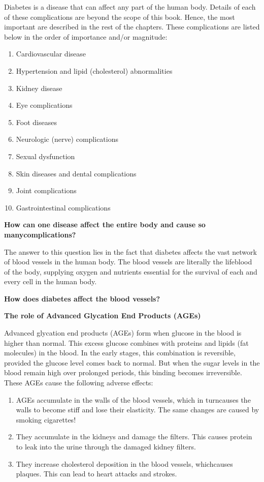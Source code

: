 Diabetes is a disease that can affect any part of the human body. Details of each of these complications are beyond the scope of this book. Hence, the most important are described in the rest of the chapters. These complications are listed below in the order of importance and/or magnitude:

\begin{enumerate}
\itemsep=0pt
\item Cardiovascular disease
\item Hypertension and lipid (cholesterol) abnormalities
\item Kidney disease
\item Eye complications
\item Foot diseases
\item Neurologic (nerve) complications
\item Sexual dysfunction
\item Skin diseases and dental complications
\item Joint complications
\item Gastrointestinal complications
\end{enumerate}

\clearpage
\noindent\textbf{How can one disease affect the entire body and cause so many\break complications?}

The answer to this question lies in the fact that diabetes affects the vast network of blood vessels in the human body. The blood vessels are literally the lifeblood of the body, supplying oxygen and nutrients essential for the survival of each and every cell in the human body.

\noindent\textbf{How does diabetes affect the blood vessels?}

\noindent\textbf{The role of Advanced Glycation End Products (AGEs)}

Advanced glycation end products (AGEs) form when glucose in the blood is higher than normal. This excess glucose combines with proteins and lipids (fat molecules) in the blood. In the early stages, this combination is reversible, provided the glucose level comes back to normal. But when the sugar levels in the blood remain high over prolonged periods, this binding becomes irreversible. These AGEs cause the following adverse effects:
\begin{enumerate}[•]
\itemsep=0pt
\item AGEs accumulate in the walls of the blood vessels, which in turn\break causes the walls to become stiff and lose their elasticity. The same changes are caused by smoking cigarettes!
\item They accumulate in the kidneys and damage the filters. This causes protein to leak into the urine through the damaged kidney filters.
\item They increase cholesterol deposition in the blood vessels, which\break causes plaques. This can lead to heart attacks and strokes.
\end{enumerate}

